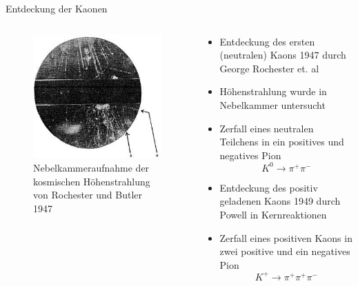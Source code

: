 \documentclass[aspectratio=1610, professionalfonts, 9pt, t]{beamer}
\begin{document}
  \begin{frame}{Entdeckung der Kaonen}
    \begin{columns}[onlytextwidth]
      \begin{column}{0.4\textwidth}
        \begin{figure}[ht]
          \begin{center}
            \includegraphics[height=0.6\textheight]{Images/Kaondiscovery.png}
            \caption{Nebelkammeraufnahme der kosmischen Höhenstrahlung von Rochester und Butler 1947}
          \end{center}
        \end{figure}
      \end{column}
      \begin{column}{0.5\textwidth}
        \begin{itemize}
          \item Entdeckung des ersten (neutralen) Kaons 1947 durch George Rochester et. al
          \item Höhenstrahlung wurde in Nebelkammer untersucht
          \item Zerfall eines neutralen Teilchens in ein positives und negatives Pion
          \begin{equation*}
            K^{0} \rightarrow \pi^{+} \pi^{-}
          \end{equation*}
          \item Entdeckung des positiv geladenen Kaons 1949 durch Powell in Kernreaktionen
          \item Zerfall eines positiven Kaons in zwei positive und ein negatives Pion
          \begin{equation*}
            K^{+} \rightarrow \pi^{+} \pi^{+} \pi^{-}
          \end{equation*}
        \end{itemize}
      \end{column}
    \end{columns}
  \end{frame}
\end{document}
